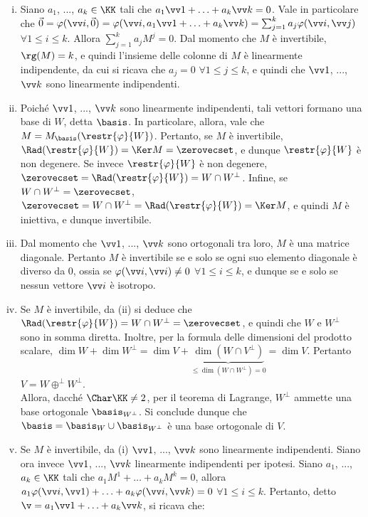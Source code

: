 \begin{solution}
	\begin{enumerate}[(i)]
		\item Siano $a_1$, ..., $a_k \in \KK$ tali che $a_1 \vv 1 + \ldots + a_k \vv k = 0$. Vale in
		particolare che $\vec 0 = \varphi(\vv i, \vec 0) = \varphi(\vv i, a_1 \vv 1 + \ldots + a_k \vv k) =
		\sum_{j=1}^k a_j \varphi(\vv i, \vv j)$ $\forall 1 \leq i \leq k$. Allora $\sum_{j=1}^k a_j M^j = 0$.
		Dal momento che $M$ è invertibile, $\rg(M) = k$, e quindi l'insieme delle colonne di $M$ è linearmente
		indipendente, da cui si ricava che $a_j = 0$ $\forall 1 \leq j \leq k$, e quindi che $\vv 1$, ...,
		$\vv k$ sono linearmente indipendenti.
		
		\item Poiché $\vv 1$, ..., $\vv k$ sono linearmente indipendenti, tali vettori formano una base di
		$W$, detta $\basis$. In particolare, allora, vale che $M = M_\basis(\restr{\varphi}{W})$. Pertanto,
		se $M$ è invertibile, $\Rad(\restr{\varphi}{W}) = \Ker M = \zerovecset$, e dunque $\restr{\varphi}{W}$
		è non degenere. Se invece $\restr{\varphi}{W}$ è non degenere, $\zerovecset = \Rad(\restr{\varphi}{W}) = W \cap W^\perp$. Infine, se $W \cap W^\perp = \zerovecset$, $\zerovecset = W \cap W^\perp = \Rad(\restr{\varphi}{W}) = \Ker M$, e quindi $M$ è iniettiva, e dunque invertibile.
		
		\item Dal momento che $\vv 1$, ..., $\vv k$ sono ortogonali tra loro, $M$ è una matrice diagonale.
		Pertanto $M$ è invertibile se e solo se ogni suo elemento diagonale è diverso da $0$, ossia
		se $\varphi(\vv i, \vv i) \neq 0$ $\forall 1 \leq i \leq k$, e dunque se e solo se nessun vettore
		$\vv i$ è isotropo.
		
		\item Se $M$ è invertibile, da (ii) si deduce che $\Rad(\restr{\varphi}{W}) = W \cap W^\perp = \zerovecset$,
		e quindi che $W$ e $W^\perp$ sono in somma diretta. Inoltre, per la formula delle dimensioni del prodotto
		scalare, $\dim W + \dim W^\perp = \dim V + \underbrace{\dim (W \cap V^\perp)}_{\leq \dim (W \cap W^\perp) = 0} = \dim V$. Pertanto $V = W \oplus^\perp W^\perp$. \\ 
		
		Allora, dacché $\Char \KK \neq 2$, per il teorema di Lagrange, $W^\perp$ ammette una base ortogonale $\basis_{W^\perp}$. Si conclude
		dunque che $\basis = \basis_W \cup \basis_{W^\perp}$ è una base ortogonale di $V$.
		
		\item Se $M$ è invertibile, da (i) $\vv1$, ..., $\vv k$ sono linearmente indipendenti. Siano ora
		invece $\vv 1$, ..., $\vv k$ linearmente indipendenti per ipotesi. Siano $a_1$, ..., $a_k \in \KK$ tali
		che $a_1 M^1 + \ldots + a_k M^k = 0$, allora $a_1 \varphi(\vv i, \vv 1) + \ldots + a_k \varphi(\vv i, \vv k) = 0$ $\forall 1 \leq i \leq k$. Pertanto, detto $\v = a_1 \vv 1 + \ldots + a_k \vv k$, si ricava che:
		

\end{enumerate}
\end{solution}
